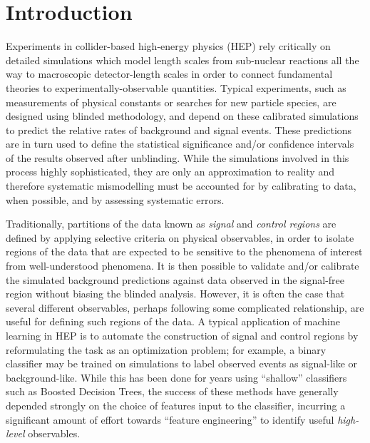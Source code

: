 \documentclass[reprint,nofootinbib,...]{revtex4-1}
\begin{document}


\section{Introduction}
\label{sec:intro}
Experiments in collider-based high-energy physics (HEP) rely critically on detailed simulations which model length scales from sub-nuclear reactions all the way to macroscopic detector-length scales in order to connect fundamental theories to experimentally-observable quantities.
Typical experiments, such as measurements of physical constants or searches for new particle species, are designed using blinded methodology, and depend on these calibrated simulations to predict the relative rates of background and signal events.
These predictions are in turn used to define the statistical significance and/or confidence intervals of the results observed after unblinding.
While the simulations involved in this process highly sophisticated, they are only an approximation to reality and therefore systematic mismodelling must be accounted for by calibrating to data, when possible, and by assessing systematic errors.

Traditionally, partitions of the data known as \textit{signal} and \textit{control regions} are defined by applying selective criteria on physical observables, in order to isolate regions of the data that are expected to be sensitive to the phenomena of interest from well-understood phenomena.
It is then possible to validate and/or calibrate the simulated background predictions against data observed in the signal-free region without biasing the blinded analysis.
However, it is often the case that several different observables, perhaps following some complicated relationship, are useful for defining such regions of the data.
A typical application of machine learning in HEP is to automate the construction of signal and control regions by reformulating the task as an optimization problem; for example, a binary classifier may be trained on simulations to label observed events as signal-like or background-like.
While this has been done for years using ``shallow'' classifiers such as Boosted Decision Trees, the success of these methods have generally depended strongly on the choice of features input to the classifier, incurring a significant amount of effort towards ``feature engineering'' to identify useful \textit{high-level} observables.
\end{document}
